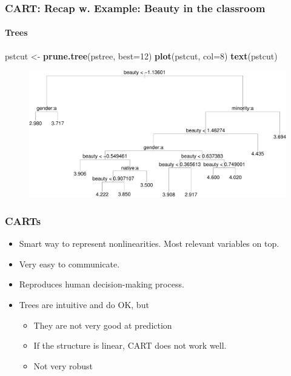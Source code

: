 \documentclass[
  shownotes,
  xcolor={svgnames},
  hyperref={colorlinks,citecolor=DarkBlue,linkcolor=DarkRed,urlcolor=DarkBlue}
  , aspectratio=169]{beamer}
\newenvironment{Shaded}{\begin{snugshade}}{\end{snugshade}}
\newcommand{\DataTypeTok}[1]{\textcolor[rgb]{0.13,0.29,0.53}{#1}}
\newcommand{\DecValTok}[1]{\textcolor[rgb]{0.00,0.00,0.81}{#1}}
\newcommand{\KeywordTok}[1]{\textcolor[rgb]{0.13,0.29,0.53}{\textbf{#1}}}
\newcommand{\NormalTok}[1]{#1}
\newcommand{\StringTok}[1]{\textcolor[rgb]{0.31,0.60,0.02}{#1}}
\begin{document}
\begin{frame}[fragile]
\frametitle{CART: Recap w. Example: Beauty in the classroom}
\framesubtitle{Trees}

\begin{scriptsize}
\begin{Shaded}
\begin{Highlighting}[]
\NormalTok{pstcut \textless{}{-}}\StringTok{ }\KeywordTok{prune.tree}\NormalTok{(pstree, }\DataTypeTok{best=}\DecValTok{12}\NormalTok{)}
\KeywordTok{plot}\NormalTok{(pstcut, }\DataTypeTok{col=}\DecValTok{8}\NormalTok{)}
\KeywordTok{text}\NormalTok{(pstcut)}
\end{Highlighting}
\end{Shaded}

\end{scriptsize}
\begin{figure}[H] \centering
            \captionsetup{justification=centering}
              \includegraphics[scale=0.4]{figures/unnamed-chunk-6-1.pdf}              
 \end{figure}


\end{frame}

\begin{frame}[fragile]
\frametitle{CARTs}

\begin{itemize}
  \item Smart way to represent nonlinearities. Most relevant variables on top.
  \medskip
  \item Very easy to communicate.
  \medskip
  \item  Reproduces human decision-making process.
  \medskip
  \item Trees are intuitive and do OK, but
  \begin{itemize}
    \item They are not very good at prediction 
  \item If the structure is linear, CART does not work well.
  \item  Not very robust
  \end{itemize}
  
\end{itemize}



\end{frame}
\end{document}
